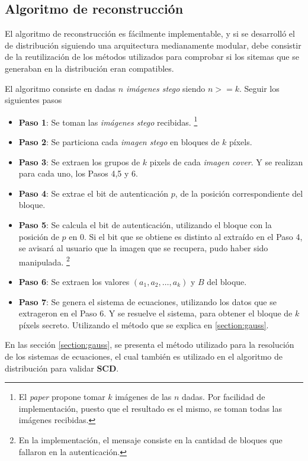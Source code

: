 \documentclass{article}
\begin{document}
\label{section:problem2}

\subsection{Algoritmo de reconstrucción}

El algoritmo de reconstrucción es fácilmente implementable, y si se desarrolló el de distribución siguiendo una arquitectura medianamente
modular, debe consistir de la reutilización de los métodos utilizados para comprobar si los sitemas que se generaban en la distribución eran compatibles.

El algoritmo consiste en dadas $n$ \emph{imágenes stego} siendo $n >= k$. Seguir los siguientes pasos

\begin{itemize}
 \item \textbf{Paso 1}: Se toman las \emph{imágenes stego} recibidas. 
 \footnote{El \emph{paper} propone tomar $k$ imágenes de las $n$ dadas. Por facilidad de implementación, puesto que el resultado es el mismo, se toman todas las imágenes recibidas.}
 \item \textbf{Paso 2}: Se particiona cada \emph{imagen stego} en bloques de $k$ píxels.
 \item \textbf{Paso 3}: Se extraen los grupos de $k$ pixels de cada \emph{imagen cover}. Y se realizan para cada uno, los Pasos 4,5 y 6.
 \item \textbf{Paso 4}: Se extrae el bit de autenticación $p$, de la posición correspondiente del bloque.
 \item \textbf{Paso 5}: Se calcula el bit de autenticación, utilizando el bloque con la posición de $p$ en 0. Si el bit que se obtiene
 es distinto al extraído en el Paso 4, se avisará al usuario que la imagen que se recupera, pudo haber sido manipulada.
 \footnote{En la implementación, el mensaje consiste en la cantidad de bloques que fallaron en la autenticación.}
 \item \textbf{Paso 6}: Se extraen los valores $(a_1, a_2, \dots, a_k)$ y $B$ del bloque.
 \item \textbf{Paso 7}: Se genera el sistema de ecuaciones, utilizando los datos que se extrageron en el Paso 6. Y se resuelve el sistema, para
 obtener el bloque de $k$ píxels secreto. Utilizando el método que se explica en \ref{section:gauss}.
\end{itemize}


En las sección \ref{section:gauss}, se presenta el método utilizado para la resolución de los sistemas de ecuaciones, el cual también es utilizado
en el algoritmo de distribución para validar \textbf{SCD}.
\end{document}
